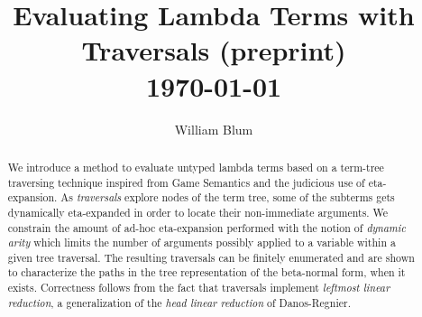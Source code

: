 \documentclass{elsarticle}
\author{William Blum}
\title{Evaluating Lambda Terms with Traversals (preprint)
\\ \vspace*{1em}
\today}
\makeatletter
\theoremstyle{plain}
\theoremstyle{definition}
\def\etal{\textit{et al.}\@\xspace}
\makeatother
\begin{document}





\begin{abstract}
    We introduce a method to evaluate untyped lambda terms based on a term-tree traversing technique inspired from Game Semantics and the judicious use of eta-expansion.
    As \emph{traversals} explore nodes of the term tree,
    some of the subterms gets dynamically eta-expanded in order to locate their non-immediate arguments.
    We constrain the amount of ad-hoc eta-expansion performed with the
    notion of \emph{dynamic arity} which limits the number of arguments possibly applied to a variable within a given tree traversal.
    The resulting traversals can be finitely enumerated and are shown
    to characterize the paths in the tree representation of the beta-normal form, when it exists.
    Correctness follows from the fact that traversals implement \emph{leftmost linear reduction}, a generalization of the \emph{head linear reduction} of Danos-Regnier.
\end{abstract}
\end{document}

